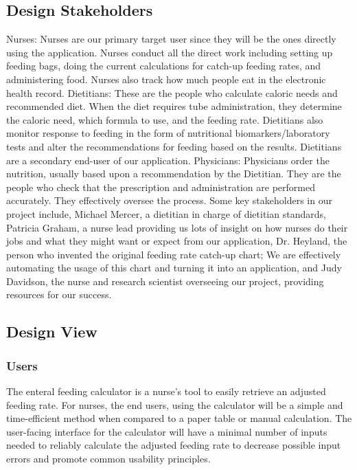\documentclass[onecolumn, draftclsnofoot,10pt, compsoc]{IEEEtran}
\begin{document}
\subsection{Design Stakeholders}
Nurses: Nurses are our primary target user since they will be the ones directly using the application. Nurses conduct all the direct work including setting up feeding bags, doing the current calculations for catch-up feeding rates, and administering food. Nurses also track how much people eat in the electronic health record.  
\newline
Dietitians: These are the people who calculate caloric needs and recommended diet. When the diet requires tube administration, they determine the caloric need, which formula to use, and the feeding rate. Dietitians also monitor response to feeding in the form of nutritional biomarkers/laboratory tests and alter the recommendations for feeding based on the results. Dietitians are a secondary end-user of our application.
\newline
Physicians: Physicians order the nutrition, usually based upon a recommendation by the Dietitian. They are the people who check that the prescription and administration are performed accurately. They effectively oversee the process.
\newline
\newline
Some key stakeholders in our project include, Michael Mercer, a dietitian in charge of dietitian standards, Patricia Graham, a nurse lead providing us lots of insight on how nurses do their jobs and what they might want or expect from our application, Dr. Heyland, the person who invented the original feeding rate catch-up chart; We are effectively automating the usage of this chart and turning it into an application, and Judy Davidson, the nurse and research scientist overseeing our project, providing resources for our success.
\subsection{Design View}
\subsubsection{Users}
The enteral feeding calculator is a nurse's tool to easily retrieve an adjusted feeding rate.
For nurses, the end users, using the calculator will be a simple and time-efficient method when compared to a paper table or manual calculation.
The user-facing interface for the calculator will have a minimal number of inputs needed to reliably calculate the adjusted feeding rate to decrease possible input errors and promote common usability principles.
\end{document}
